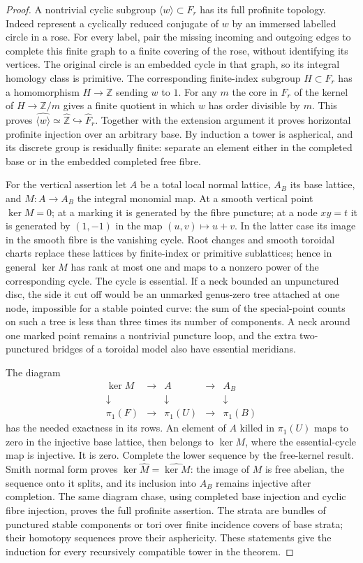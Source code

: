 \begin{proof}
A nontrivial cyclic subgroup $\langle w\rangle\subset F_r$ has its full
profinite topology. Indeed represent a cyclically reduced conjugate
of $w$ by an immersed labelled circle in a rose. For every label, pair
the missing incoming and outgoing edges to complete this finite graph
to a finite covering of the rose, without identifying its vertices.
The original circle is an embedded cycle in that graph, so its integral
homology class is primitive. The corresponding finite-index subgroup
$H\subset F_r$ has a homomorphism $H\to\mathbb Z$ sending $w$ to $1$.
For any $m$ the core in $F_r$ of the kernel of $H\to\mathbb Z/m$
gives a finite quotient in which $w$ has order divisible by $m$.
This proves $\widehat{\langle w\rangle}\simeq\widehat{\mathbb Z}
\hookrightarrow\widehat F_r$. Together with the extension argument it
proves horizontal profinite injection over an arbitrary base. By
induction a tower is aspherical, and its discrete group is residually
finite: separate an element either in the completed base or in the
embedded completed free fibre.

For the vertical assertion let $A$ be a total local normal lattice,
$A_B$ its base lattice, and $M:A\to A_B$ the integral monomial map.
At a smooth vertical point $\ker M=0$; at a marking it is generated
by the fibre puncture; at a node $xy=t$ it is generated by $(1,-1)$
in the map $(u,v)\mapsto u+v$. In the latter case its image in the smooth
fibre is the vanishing cycle. Root changes and smooth toroidal charts
replace these lattices by finite-index or primitive sublattices; hence
in general $\ker M$ has rank at most one and maps to a nonzero power
of the corresponding cycle. The cycle is essential. If a neck bounded
an unpunctured disc, the side it cut off would be an unmarked genus-zero
tree attached at one node, impossible for a stable pointed curve:
the sum of the special-point counts on such a tree is less than three
times its number of components. A neck around one marked point remains
a nontrivial puncture loop, and the extra two-punctured bridges of a
toroidal model also have essential meridians.

The diagram
\[
\begin{array}{ccccc}
 \ker M&\longrightarrow&A&\longrightarrow&A_B\\
 \downarrow&&\downarrow&&\downarrow\\
 \pi_1(F)&\longrightarrow&\pi_1(U)&\longrightarrow&\pi_1(B)
\end{array}
\]
has the needed exactness in its rows. An element of $A$ killed in
$\pi_1(U)$ maps to zero in the injective base lattice, then belongs to
$\ker M$, where the essential-cycle map is injective. It is zero.
Complete the lower sequence by the free-kernel result. Smith normal
form proves $\ker\widehat M=\widehat{\ker M}$: the image of $M$ is
free abelian, the sequence onto it splits, and its inclusion into
$A_B$ remains injective after completion. The same diagram chase,
using completed base injection and cyclic fibre injection, proves the
full profinite assertion. The strata are bundles of punctured stable
components or tori over finite incidence covers of base strata; their
homotopy sequences prove their asphericity. These statements give the
induction for every recursively compatible tower in the theorem.


\end{proof}
